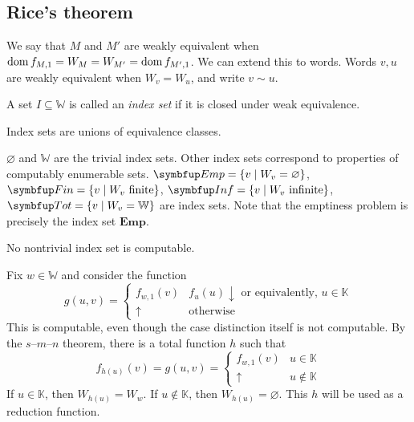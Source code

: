 \subsection{Rice's theorem}
We say that \( M \) and \( M' \) are weakly equivalent when \( \operatorname{dom} f_{M,1} = W_M = W_{M'} = \operatorname{dom} f_{M',1} \).
We can extend this to words.
Words \( v, u \) are weakly equivalent when \( W_v = W_u \), and write \( v \sim u \).
\begin{definition}
	A set \( I \subseteq \mathbb W \) is called an \emph{index set} if it is closed under weak equivalence.
\end{definition}
\begin{remark}
	Index sets are unions of equivalence classes.
\end{remark}
\begin{example}
	\( \varnothing \) and \( \mathbb W \) are the trivial index sets.
	Other index sets correspond to properties of computably enumerable sets.
	\( \mathbf{Emp} = \qty{v \mid W_v = \varnothing} \), \( \mathbf{Fin} = \qty{v \mid W_v \text{ finite}} \), \( \mathbf{Inf} = \qty{v \mid W_v \text{ infinite}} \), \( \mathbf{Tot} = \qty{v \mid W_v = \mathbb W} \) are index sets.
	Note that the emptiness problem is precisely the index set \( \mathbf{Emp} \).
\end{example}
\begin{theorem}
	No nontrivial index set is computable.
\end{theorem}
Fix \( w \in \mathbb W \) and consider the function
\[ g(u,v) = \begin{cases}
	f_{w,1}(v) & f_u(u) \downarrow \text{ or equivalently, } u \in \mathbb K \\
	\uparrow & \text{otherwise}
\end{cases} \]
This is computable, even though the case distinction itself is not computable.
By the \( s \)--\( m \)--\( n \) theorem, there is a total function \( h \) such that
\[ f_{h(u)}(v) = g(u,v) = \begin{cases}
	f_{w,1}(v) & u \in \mathbb K \\
	\uparrow & u \not\in \mathbb K
\end{cases} \]
If \( u \in \mathbb K \), then \( W_{h(u)} = W_w \).
If \( u \not\in \mathbb K \), then \( W_{h(u)} = \varnothing \).
This \( h \) will be used as a reduction function.

